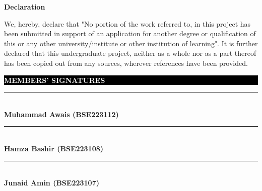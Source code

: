 
\clearpage


\vspace*{-0.15cm} 
{\centering
    {\fontsize{16pt}{20pt}\selectfont \textbf{Declaration} \par}
}
\vspace{0.5cm}

\noindent
We, hereby, declare that "No portion of the work referred to, in this project has been submitted in support of an application for another degree or qualification of this or any other university/institute or other institution of learning". It is further declared that this undergraduate project, neither as a whole nor as a part thereof has been copied out from any sources, wherever references have been provided.

\vspace{4cm}

\begin{flushright}
    \colorbox{black}{\parbox{0.45\textwidth}{%
        \vspace{0.3cm}\centering \textbf{\textcolor{white}{MEMBERS' SIGNATURES}}\vspace{0.3cm}}}
    
    \vspace{1.2cm}
    
    \rule{0.45\textwidth}{0.4pt} \\
    \textbf{Muhammad Awais (BSE223112)} \\[1.2cm]
    \rule{0.45\textwidth}{0.4pt} \\
    \textbf{Hamza Bashir (BSE223108)} \\[1.2cm]
    \rule{0.45\textwidth}{0.4pt} \\
    \textbf{Junaid Amin (BSE223107)}
\end{flushright}

